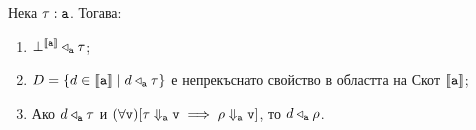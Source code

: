 \begin{lemma}\label{lem:pcf:relation}
  Нека $\tau : \texttt{a}$. Тогава:
  \begin{enumerate}[1)]
  \item
    $\bot^{\llbracket{\texttt{a}}\rrbracket} \triangleleft_{\texttt{a}} \tau$;
  \item
    $D = \{d \in \llbracket{\texttt{a}}\rrbracket \mid d \triangleleft_{\texttt{a}} \tau\}$ е непрекъснато свойство в областта на Скот $\llbracket{\texttt{a}}\rrbracket$;
  \item
    Ако $d \triangleleft_{\texttt{a}} \tau$ и $(\forall \texttt{v})[\tau \Downarrow_{\texttt{a}} \texttt{v} \implies \rho
    \Downarrow_{\texttt{a}} \texttt{v}]$, то $d \triangleleft_{\texttt{a}} \rho$.
  \end{enumerate}
\end{lemma}
